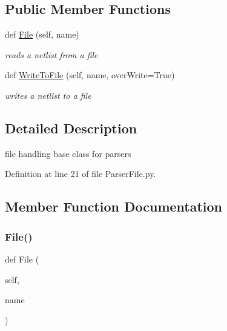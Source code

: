 \subsection*{Public Member Functions}
\begin{DoxyCompactItemize}
\item 
def \hyperlink{classSignalIntegrity_1_1Parsers_1_1ParserFile_1_1ParserFile_ab48ee0f71a0a2ded86c7adbc2a72034e}{File} (self, name)
\begin{DoxyCompactList}\small\item\em reads a netlist from a file \end{DoxyCompactList}\item 
def \hyperlink{classSignalIntegrity_1_1Parsers_1_1ParserFile_1_1ParserFile_a3ae128216b7f0540f8cd3793c4ed4903}{Write\+To\+File} (self, name, over\+Write=True)
\begin{DoxyCompactList}\small\item\em writes a netlist to a file \end{DoxyCompactList}\end{DoxyCompactItemize}


\subsection{Detailed Description}
file handling base class for parsers 

Definition at line 21 of file Parser\+File.\+py.



\subsection{Member Function Documentation}
\mbox{\label{classSignalIntegrity_1_1Parsers_1_1ParserFile_1_1ParserFile_ab48ee0f71a0a2ded86c7adbc2a72034e}} 
\subsubsection{\texorpdfstring{File()}{File()}}
{\footnotesize\ttfamily def File (\begin{DoxyParamCaption}\item[{}]{self,  }\item[{}]{name }\end{DoxyParamCaption})}



